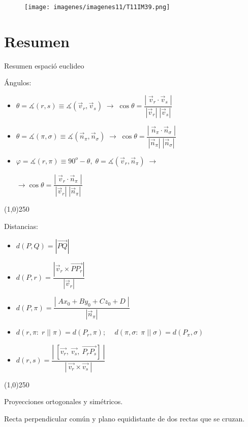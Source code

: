 $\quad$ 

$\quad$ 

$\quad$ %

\begin{figure}[H]
		\centering
		\texttt{[image: imagenes/imagenes11/T11IM39.png]}
	\end{figure}

\newpage %

\section{Resumen}

\begin{myalertblock}{Resumen espació euclideo}

Ángulos:

\begin{itemize}
\item $\theta=\measuredangle(r,s)\equiv \measuredangle(\vec v_r,\vec v_s) \; \to \; \cos \theta = \dfrac {|\;\vec v_r \cdot \vec v_s\;|}{|\vec v_r|\;|\vec v_s|}$

\item $\theta=\measuredangle(\pi,\sigma)\equiv \measuredangle(\vec n_{\pi},\vec n_{\sigma}) \; \to \; \cos \theta = \dfrac {|\;\vec n_{\pi} \cdot \vec n_{\sigma}\;|}{|\vec n_{\pi}|\;|\vec n_{\sigma}|}$

\item $\varphi=\measuredangle(r,\pi)\equiv 90^o-\theta,\;\theta=\measuredangle(\vec v_r,\vec n_{\pi}) \; \to \;$

$\to  \cos \theta = \dfrac {|\;\vec v_r \cdot \vec n_{\pi}\;|}{|\vec v_r|\;|\vec n_{\pi}|}$
\end{itemize}
\line(1,0){250} 

Distancias:

\begin{itemize}
\item $d(P,Q)=|\overrightarrow{PQ}|$ $\qquad$
\item $d(P,r)=\dfrac {|\vec v_r \times \overrightarrow{PP_r}|}{|\vec v_r|}$

\item $d(P,\pi)=\dfrac {|\;Ax_0+By_0+Cz_0+D\;|}{|\vec n_{\pi}|}$

\item \begin{small}$d(r,\pi:\; r\;||\; \pi)=d(P_r,\pi)$;$\quad$
$d(\pi,\sigma:\;\pi\;||\;\sigma)=d(P_{\pi},\sigma)$\end{small}

\item $d(r,s)=\dfrac{|\ [\vec{v_r},\ \vec{v_{s}},\ \overrightarrow{P_rP_s}]\ |}{|\ \vec{v_r} \times \vec{v_s} \ |}$
\end{itemize}
\line(1,0){250} 

Proyecciones ortogonales y simétricos.

Recta perpendicular común y plano equidistante de dos rectas que se cruzan.

\end{myalertblock}




